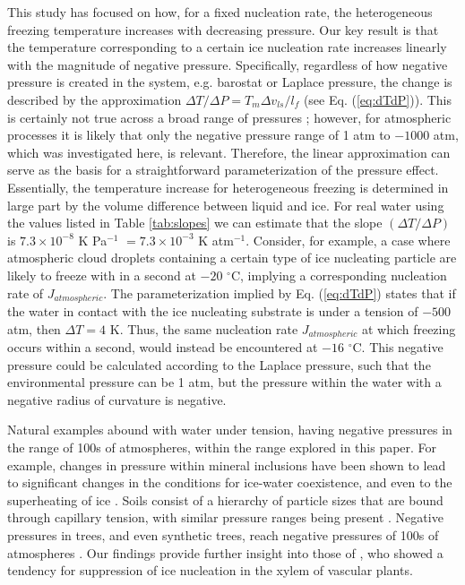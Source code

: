 \documentclass[journal abbreviation, manuscript]{copernicus}
\begin{document}
This study has focused on how, for a fixed nucleation rate, the heterogeneous freezing temperature increases with decreasing pressure. Our key result is that the temperature corresponding to a certain ice nucleation rate increases linearly with the magnitude of negative pressure. Specifically, regardless of how negative pressure is created in the system, e.g. barostat or Laplace pressure, the change is described by the approximation $\Delta T/\Delta P = T_m \Delta v_{ls} / l_f$ (see Eq. (\ref{eq:dTdP})). This is certainly not true across a broad range of pressures \citep[e.g.,][]{bianco2021, espinosa2016}; however, for atmospheric processes it is likely that only the negative pressure range of 1 atm to $-1000$ atm, which was investigated here, is relevant. Therefore, the linear approximation can serve as the basis for a straightforward parameterization of the pressure effect. Essentially, the temperature increase for heterogeneous freezing is determined in large part by the volume difference between liquid and ice. For real water using the values listed in Table \ref{tab:slopes} we can estimate that the slope $(\Delta T/\Delta P)$ is $7.3 \times 10^{-8}$ K Pa$^{-1}$ $= 7.3 \times 10^{-3}$ K atm$^{-1}$. Consider, for example, a case where atmospheric cloud droplets containing a certain type of ice nucleating particle are likely to freeze with in a second at $-20$ $^\circ$C, implying a corresponding nucleation rate of $J_{atmospheric}$. The parameterization implied by Eq. (\ref{eq:dTdP}) states that if the water in contact with the ice nucleating substrate is under a tension of $-500$ atm, then $\Delta T = 4$ K. Thus, the same nucleation rate $J_{atmospheric}$ at which freezing occurs within a second, would instead be encountered at $-16$ $^\circ$C. This negative pressure could be calculated according to the Laplace pressure, such that the environmental pressure can be 1 atm, but the pressure within the water with a negative radius of curvature is negative.

Natural examples abound with water under tension, having negative pressures in the range of 100s of atmospheres, within the range explored in this paper. For example, changes in pressure within mineral inclusions have been shown to lead to significant changes in the conditions for ice-water coexistence, and even to the superheating of ice \citep{roedder1967metastable}. Soils consist of a hierarchy of particle sizes that are bound through capillary tension, with similar pressure ranges being present \citep{seiphoori2020}. Negative pressures in trees, and even synthetic trees, reach negative pressures of 100s of atmospheres \citep{wheeler2008transpiration}. Our findings provide further insight into those of \citet{lintunen2013anatomical}, who showed a tendency for suppression of ice nucleation in the xylem of vascular plants. 
\end{document}

